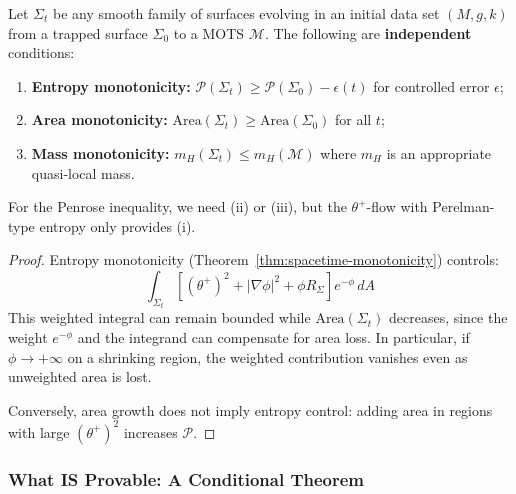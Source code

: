 \begin{proposition}
\label{prop:fundamental-gap}
Let $\Sigma_t$ be any smooth family of surfaces evolving in an initial data set $(M,g,k)$ from a trapped surface $\Sigma_0$ to a MOTS $\mathcal{M}$. The following are \textbf{independent} conditions:
\begin{enumerate}[label=(\roman*)]
\item \textbf{Entropy monotonicity:} $\mathcal{P}(\Sigma_t) \geq \mathcal{P}(\Sigma_0) - \epsilon(t)$ for controlled error $\epsilon$;
\item \textbf{Area monotonicity:} $\mathrm{Area}(\Sigma_t) \geq \mathrm{Area}(\Sigma_0)$ for all $t$;
\item \textbf{Mass monotonicity:} $m_H(\Sigma_t) \leq m_H(\mathcal{M})$ where $m_H$ is an appropriate quasi-local mass.
\end{enumerate}
For the Penrose inequality, we need (ii) or (iii), but the $\theta^+$-flow with Perelman-type entropy only provides (i).
\end{proposition}

\begin{proof}
Entropy monotonicity (Theorem~\ref{thm:spacetime-monotonicity}) controls:
\[
\int_{\Sigma_t} \left[(\theta^+)^2 + |\nabla\phi|^2 + \phi R_{\Sigma}\right] e^{-\phi} \, dA
\]
This weighted integral can remain bounded while $\mathrm{Area}(\Sigma_t)$ decreases, since the weight $e^{-\phi}$ and the integrand can compensate for area loss. In particular, if $\phi \to +\infty$ on a shrinking region, the weighted contribution vanishes even as unweighted area is lost.

Conversely, area growth does not imply entropy control: adding area in regions with large $(\theta^+)^2$ increases $\mathcal{P}$.
\end{proof}

\subsubsection{What IS Provable: A Conditional Theorem}

